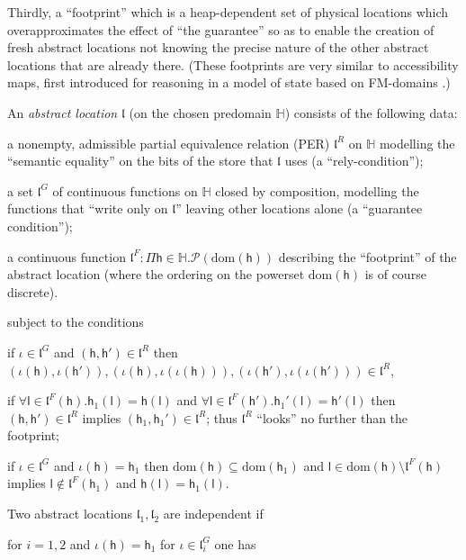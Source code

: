 \documentclass[orivec]{llncs}
\newcommand{\dom}[1]{\mathrm{dom}({#1})}
\newcommand{\Stores}{\ensuremath{\mathbb{H}}}
\newcommand{\loc}{\mathfrak{l}}
\newcommand{\cloc}{\ensuremath{\mathsf{l}}\xspace}
\newcommand\heap{\ensuremath{\mathsf{h}}\xspace}
\begin{document}
Thirdly, a ``footprint'' which is a heap-dependent set of
physical locations which overapproximates the effect of ``the
guarantee'' so as to enable the creation of fresh abstract locations
not knowing the precise nature of the other abstract locations that
are already there. (These footprints are very similar to
accessibility maps, first introduced for reasoning in a model of state based on FM-domains \cite{DBLP:conf/tlca/BentonL05}.)

\begin{definition}
\label{def:abstract-location}
  An \emph{abstract location} $\loc$ (on the chosen predomain
  $\Stores$) consists of the following data:
\begin{compactitem}
\item a nonempty, admissible partial equivalence relation (PER) $\loc^R$ on
  $\Stores$ modelling the ``semantic equality'' on the bits of the
  store that $\loc$ uses (a ``rely-condition'');
\item a set $\loc^G$ of continuous functions on $\Stores$ closed by
composition, modelling the functions that ``write only on $\loc$'' leaving 
other locations alone (a ``guarantee condition'');
\item a continuous function $\loc^F:\Pi
  \heap\in\Stores.\mathcal{P}(\dom\heap)$ describing the ``footprint''
   of the abstract location (where the ordering on the powerset
$\mathcal{\dom\heap}$ is of course discrete).
\end{compactitem}
subject to the conditions
\begin{compactitem}
\item if $\iota\in \loc^G$ and $(\heap,\heap')\in\loc^R$ then $(\iota(\heap),\iota(\heap')), 
(\iota(\heap),\iota(\iota(\heap))), (\iota(\heap'),\iota(\iota(\heap')))\in\loc^R$,  
\item if $\forall\cloc\in\loc^F(\heap).\heap_1(\cloc)=\heap(\cloc)$
  and $\forall\cloc\in\loc^F(\heap').\heap_1'(\cloc)=\heap'(\cloc)$
  then $(\heap,\heap')\in\loc^R$ implies
  $(\heap_1,\heap_1')\in\loc^R$; thus $\loc^R$ ``looks'' no further
  than the footprint;
\item if $\iota \in \loc^G$ and $\iota(\heap) = \heap_1$ then
  $\dom\heap\subseteq\dom{\heap_1}$ and
  $\cloc\in\dom\heap\setminus \loc^F(\heap)$ implies $\cloc\not\in
  \loc^F(\heap_1)$ and $\heap(\cloc)=\heap_1(\cloc)$.
\end{compactitem}
Two abstract locations $\loc_1,\loc_2$ are independent if 
\begin{compactitem}
\item for $i=1,2$ and $\iota(\heap)=\heap_1$ for $\iota\in\loc^G_i$ one has 

\end{compactitem}
\end{definition}
\end{document}

